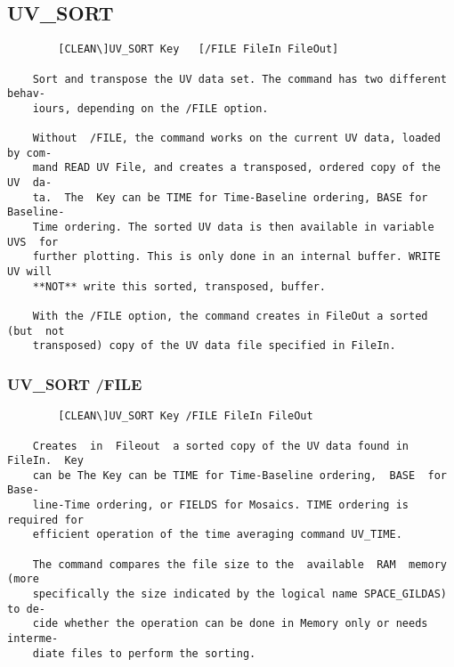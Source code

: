 \subsection{UV\_SORT}
\begin{verbatim}
        [CLEAN\]UV_SORT Key   [/FILE FileIn FileOut]

    Sort and transpose the UV data set. The command has two different behav-
    iours, depending on the /FILE option.

    Without  /FILE, the command works on the current UV data, loaded by com-
    mand READ UV File, and creates a transposed, ordered copy of the UV  da-
    ta.  The  Key can be TIME for Time-Baseline ordering, BASE for Baseline-
    Time ordering. The sorted UV data is then available in variable UVS  for
    further plotting. This is only done in an internal buffer. WRITE UV will
    **NOT** write this sorted, transposed, buffer.

    With the /FILE option, the command creates in FileOut a sorted (but  not
    transposed) copy of the UV data file specified in FileIn.

\end{verbatim}
\subsubsection{UV\_SORT /FILE}
\begin{verbatim}
        [CLEAN\]UV_SORT Key /FILE FileIn FileOut

    Creates  in  Fileout  a sorted copy of the UV data found in FileIn.  Key
    can be The Key can be TIME for Time-Baseline ordering,  BASE  for  Base-
    line-Time ordering, or FIELDS for Mosaics. TIME ordering is required for
    efficient operation of the time averaging command UV_TIME.

    The command compares the file size to the  available  RAM  memory  (more
    specifically the size indicated by the logical name SPACE_GILDAS) to de-
    cide whether the operation can be done in Memory only or needs  interme-
    diate files to perform the sorting.

\end{verbatim}
